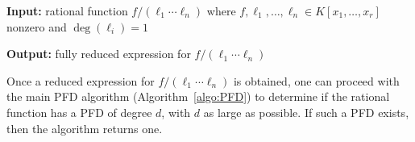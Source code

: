 \documentclass [a4paper,reqno, 11pt]{amsart}
\theoremstyle{plain}
\theoremstyle{plain}
\theoremstyle{plain}
\theoremstyle{plain}
\theoremstyle{definition}
\theoremstyle{definition}
\theoremstyle{definition}
\theoremstyle{definition}
\theoremstyle{definition}
\theoremstyle{definition}
\begin{document}
\begin{algorithm}
	\caption{\texttt{ReducedExp}}
	\label{algo:reduced}
	\begin{flushleft}
		\textbf{Input:} rational function $f/(\ell_1\cdots\ell_n)$ where $f,\ell_1,\ldots,\ell_n\in K[x_1,\ldots,x_r]$ nonzero and $\deg(\ell_i)=1$
		
		\textbf{Output:} fully reduced expression for $f/(\ell_1\cdots\ell_n)$
	\end{flushleft}
	\begin{algorithmic}[1]
        \ELSE
        \ENDIF
    \ENDFOR
	\end{algorithmic}
\end{algorithm}

Once a reduced expression for $f/(\ell_1\cdots\ell_n)$ is obtained, one can proceed with the main PFD algorithm (Algorithm~\ref{algo:PFD}) to determine if the rational function has a PFD of degree $d$, with $d$ as large as possible. If such a PFD exists, then the algorithm returns one.
\end{document}
